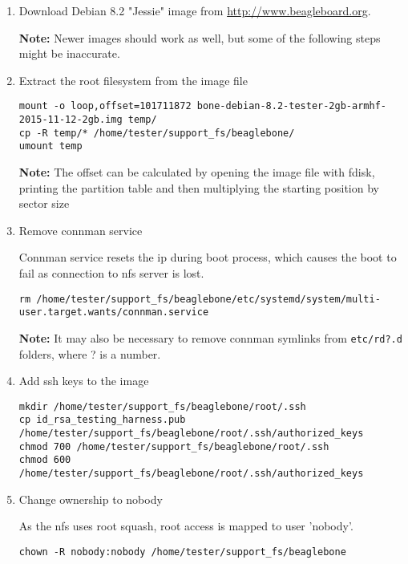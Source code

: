 \documentclass[a4paper,11pt]{article}
\newcommand{\note}{\textbf{Note: }}
\newcommand{\cmd}[1]{\texttt{#1}}
\begin{document}
\begin{enumerate}
\item Download Debian 8.2 "Jessie" image from \url{http://www.beagleboard.org}.

\note Newer images should work as well, but some of the following steps might be inaccurate.

\item Extract the root filesystem from the image file
\begin{lstlisting}
mount -o loop,offset=101711872 bone-debian-8.2-tester-2gb-armhf-2015-11-12-2gb.img temp/
cp -R temp/* /home/tester/support_fs/beaglebone/
umount temp
\end{lstlisting}

\note The offset can be calculated by opening the image file with fdisk, printing the partition table and then multiplying the starting position by sector size

\item Remove connman service

Connman service resets the ip during boot process, which causes the boot to fail as connection to nfs server is lost.


\begin{lstlisting}
rm /home/tester/support_fs/beaglebone/etc/systemd/system/multi-user.target.wants/connman.service
\end{lstlisting}

\note It may also be necessary to remove connman symlinks from \cmd{etc/rd?.d} folders, where ? is a number.


\item Add ssh keys to the image

\begin{lstlisting}
mkdir /home/tester/support_fs/beaglebone/root/.ssh
cp id_rsa_testing_harness.pub /home/tester/support_fs/beaglebone/root/.ssh/authorized_keys
chmod 700 /home/tester/support_fs/beaglebone/root/.ssh
chmod 600 /home/tester/support_fs/beaglebone/root/.ssh/authorized_keys
\end{lstlisting}


\item Change ownership to nobody

As the nfs uses root squash, root access is mapped to user 'nobody'.

\begin{lstlisting}
chown -R nobody:nobody /home/tester/support_fs/beaglebone
\end{lstlisting}




\end{enumerate}
\end{document}
